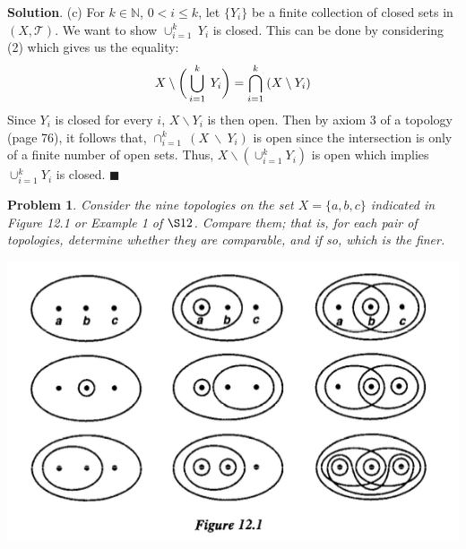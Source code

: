 \documentclass[12pt]{article}
\renewcommand{\=}[1]{\stackrel{#1}{=}} %
\providecommand{\NN}{\mathbb{N}}
\providecommand{\T}{\mathcal{T}}
\newtheorem{p}{Problem}[section]
\theoremstyle{definition}
\newenvironment{s}{%
        \begin{trivlist} \item \textbf{Solution}. }{%
            \hspace*{\fill} $\blacksquare$\end{trivlist}}%
\begin{document}
\begin{s}
    (c) For $k\in\NN$, $0<i\leq k$, let $\{Y_i\}$ be a finite collection of closed sets in $(X,\T)$. We want to show $\cup_{i=1}^k\:  Y_i$
    is closed. This can be done by considering (2) which gives us the equality:
    \[ X\:\backslash\:\bigg{(}\bigcup_{i=1}^k\:Y_i\bigg{)} = \bigcap_{i=1}^k\: (X\:\backslash\:Y_i) \]
    Since $Y_i$ is closed for every $i$, $X\backslash Y_i$ is then open. Then by axiom 3 of a topology (page 76), it follows that,
    $\cap_{i=1}^k\: (X\:\backslash\:Y_i)$ is open since the intersection is only of a finite number of open sets. Thus, $X\backslash(\cup_{i=1}^k Y_i)$ is
    open which implies $\cup_{i=1}^k Y_i$ is closed.
\end{s}

\newpage

\begin{p}
    Consider the nine topologies on the set $X = \{a,b,c\}$ indicated in Figure 12.1 or Example 1 of $\S 12$. Compare
    them; that is, for each pair of topologies, determine whether they are comparable, and if so, which is
    the finer. 

    \includegraphics[width=\textwidth]{figure12-1}
\end{p}
\end{document}

